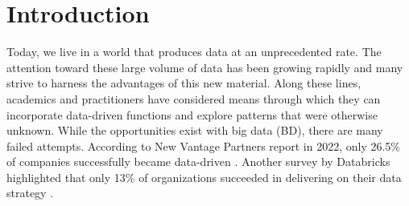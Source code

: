\documentclass{bmcart}
\begin{document}
\begin{frontmatter}
\begin{abstractbox}

\begin{keyword}
\end{keyword}


\end{abstractbox}
%

\end{frontmatter}




\section{Introduction}


Today, we live in a world that produces data at an unprecedented rate. The attention toward these large volume of data has been growing rapidly and many strive to harness the advantages of this new material. Along these lines, academics and practitioners have considered means through which they can incorporate data-driven functions and explore patterns that were otherwise unknown. While the opportunities exist with big data (BD), there are many failed attempts. According to New Vantage Partners report in 2022, only 26.5\% of companies successfully became data-driven \cite{NewVantageSurvey}. Another survey by Databricks highlighted that only 13\% of organizations succeeded in delivering on their data strategy \cite{DataBricksSurvey}. 
\end{document}
